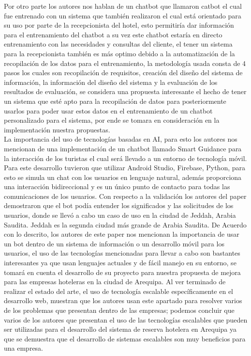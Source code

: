 \documentclass[12pt,a4paper,oneside]{article}
\begin{document}
    Por otro parte los autores nos hablan de un chatbot que llamaron catbot el cual fue entrenado  con un sistema que también realizaron el cual está orientado para su uso por parte de la recepcionista del hotel, esto permitiría dar información para el entrenamiento del chatbot a su vez este chatbot estaría en directo entrenamiento con las necesidades y consultas del cliente, el tener un sistema para la recepcionista también es más optimo debido a la automatización de la recopilación de los datos para el entrenamiento, la metodología usada consta de 4 pasos los cuales son recopilación de requisitos, creación del diseño del sistema de información, la información del diseño del sistema y la evaluación de los resultados de evaluación, se considera una propuesta interesante el hecho de tener un sistema que esté apto para la recopilación de datos para posteriormente usarlos para poder usar estos datos en el entrenamiento de un chatbot personalizado para el sistema, por ende se tomara en consideración en la implementación nuestra propuestas.\cite{Levannoza2020} \\
    La importancia del uso de tecnologías basadas en AI, para esto los autores nos mencionan de una implementación de un chatbot llamado Smart Guidance para la interacción de los turistas el cual será llevado a un entorno de tecnología móvil. Para este desarrollo tuvieron que utilizar Android Studio, Firebase, Python, para esto se simula un chat con los usuarios en lenguaje natural, además proporciona una interacción bidireccional y es un único punto de contacto para todas las comunicaciones de los usuarios. Con respecto a la validación los autores del paper demostraron que el bot podía entender los significados y las solicitudes de los usuarios, donde se llevó a cabo un caso de uso en la ciudad de Jeddah, Arabia Saudita. Jeddah es la segunda ciudad más grande de Arabia Saudita. De Acuerdo con lo descrito, los autores de este paper nos mencionan la importancia de usar un bot dentro de un sistema de información o un desarrollo móvil para los usuarios, el uso de las tecnologías mencionadas para llevar a cabo son bastantes interesantes ya que usan lenguajes actuales y de fácil manejo en su entorno, se tomará en cuenta el desarrollo de su proyecto para nuestra propuesta de mejora para las empresas hoteleras en la ciudad de Arequipa.\cite{Alotaibi2020}
    Al ver terminado de realizar el estado del arte, el uso de tecnología escalable específicamente  en el desarrollo web, muestran que los autores usan este apartado para resolver varios de los problemas que presentan dentro de las empresas; podemos concluir que varios de los autores que presentan el uso de las tecnologías escalables que pueden ser utilizadas para el desarrollo del sistema de reserva hotelera en Arequipa ya que se demuestra que el desarrollo de sistemas escalables son muy beneficios para una empresa. 
\end{document}
